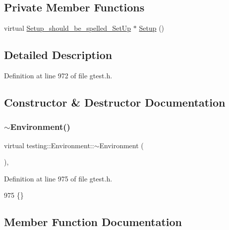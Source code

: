 \subsection*{Private Member Functions}
\begin{DoxyCompactItemize}
\item 
virtual \hyperlink{structtesting_1_1Environment_1_1Setup__should__be__spelled__SetUp}{Setup\+\_\+should\+\_\+be\+\_\+spelled\+\_\+\+Set\+Up} $\ast$ \hyperlink{classtesting_1_1Environment_a6096a69b03f6eb727a69a39f854cc87b}{Setup} ()
\end{DoxyCompactItemize}


\subsection{Detailed Description}


Definition at line 972 of file gtest.\+h.



\subsection{Constructor \& Destructor Documentation}
\mbox{\label{classtesting_1_1Environment_a0e41c320362576d752cd1f44cabd57d4}} 
\subsubsection{\texorpdfstring{$\sim$\+Environment()}{~Environment()}}
{\footnotesize\ttfamily virtual testing\+::\+Environment\+::$\sim$\+Environment (\begin{DoxyParamCaption}{ }\end{DoxyParamCaption})\hspace{0.3cm}{\ttfamily [inline]}, {\ttfamily [virtual]}}



Definition at line 975 of file gtest.\+h.


\begin{DoxyCode}
975 \{\}
\end{DoxyCode}


\subsection{Member Function Documentation}
\mbox{\label{classtesting_1_1Environment_a1bf8cafaa9d4eba9feb98655ee434eb3}} 
